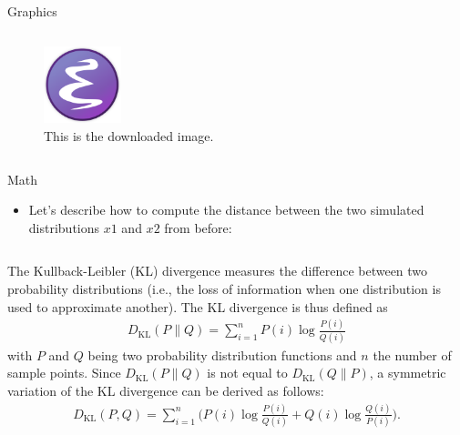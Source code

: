 \documentclass[final]{beamer}
\newcommand\sumin{\sum_{i=1}^{n}}
\newcommand{\Xoi}[1]{#1(i)}
\newcommand{\frakPQ}[2]{\frac{\Xoi{#1}}{\Xoi{#2}}}
\newcommand{\DKLPQ}[3]{D_{\mathrm{KL}}(#1 #3 #2)}
\begin{document}
\begin{frame}[fragile,label={sec:org88bd8a7}]{}
\begin{columns}
\begin{column}[t]{0.45\columnwidth}
\begin{block}{Graphics}
\begin{columns}
\begin{column}[T]{0.78\columnwidth}
\vspace{2cm}

\begin{figure}[htbp]
\centering
\includegraphics[page=9,width=0.2\textwidth]{emacs.png}
\caption{\label{fig:orge518712}
This is the downloaded image.}
\end{figure}
\end{column}
\end{columns}
\end{block}

\begin{block}{Math}
\begin{itemize}
\item Let's describe how to compute the distance between the
two simulated distributions \(x1\) and \(x2\) from before:
\end{itemize}

\begin{columns}
\begin{column}[T]{0.78\columnwidth}
\small
The Kullback-Leibler (KL) divergence measures the difference between two
probability distributions (i.e., the loss of information when one
distribution is used to approximate another). The KL divergence is thus
defined as
\begin{align} 
\label{eq:KL} 
\DKLPQ{P}{Q}{\|} = \sumin \Xoi{P} \log \frakPQ{P}{Q}
\end{align} 
with \(P\) and \(Q\) being two probability distribution functions and \(n\)
the number of sample points. Since \(\DKLPQ{P}{Q}{\|}\) is not equal to
\(\DKLPQ{Q}{P}{\|}\), a symmetric variation of the KL divergence can be
derived as follows:
\small
\begin{align} 
\label{eq:KL2} 
\DKLPQ{P}{Q}{,} = \sumin \Big(\Xoi{P} \log \frakPQ{P}{Q} + \Xoi{Q} \log \frakPQ{Q}{P} \Big).
\end{align}
\end{column}
\end{columns}
\end{block}


\end{column}
\end{columns}
\end{frame}
\end{document}
